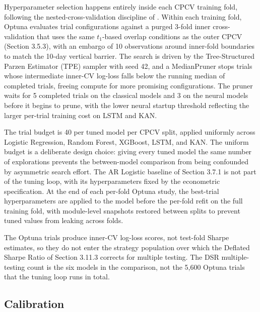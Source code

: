 \documentclass[12pt,a4paper,oneside]{article}
\begin{document}
Hyperparameter selection happens entirely inside each CPCV training fold, following the nested-cross-validation discipline of \citet[Chapter 7]{lopez_de_prado_2018}. Within each training fold, Optuna evaluates trial configurations against a purged 3-fold inner cross-validation that uses the same $t_1$-based overlap conditions as the outer CPCV (Section 3.5.3), with an embargo of 10 observations around inner-fold boundaries to match the 10-day vertical barrier. The search is driven by the Tree-Structured Parzen Estimator (TPE) sampler \citep{akiba_optuna_2019} with seed 42, and a MedianPruner stops trials whose intermediate inner-CV log-loss falls below the running median of completed trials, freeing compute for more promising configurations. The pruner waits for 5 completed trials on the classical models and 3 on the neural models before it begins to prune, with the lower neural startup threshold reflecting the larger per-trial training cost on LSTM and KAN.

The trial budget is 40 per tuned model per CPCV split, applied uniformly across Logistic Regression, Random Forest, XGBoost, LSTM, and KAN. The uniform budget is a deliberate design choice: giving every tuned model the same number of explorations prevents the between-model comparison from being confounded by asymmetric search effort. The AR Logistic baseline of Section 3.7.1 is not part of the tuning loop, with its hyperparameters fixed by the econometric specification. At the end of each per-fold Optuna study, the best-trial hyperparameters are applied to the model before the per-fold refit on the full training fold, with module-level snapshots restored between splits to prevent tuned values from leaking across folds.

The Optuna trials produce inner-CV log-loss scores, not test-fold Sharpe estimates, so they do not enter the strategy population over which the Deflated Sharpe Ratio of Section 3.11.3 corrects for multiple testing. The DSR multiple-testing count is the six models in the comparison, not the 5,600 Optuna trials that the tuning loop runs in total.


\subsection{Calibration}\label{subsec:calibration}
\end{document}
